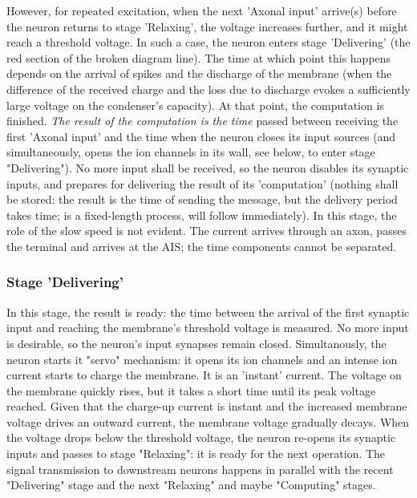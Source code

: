 However, for repeated excitation, when the next 'Axonal input' arrive(s) before
the neuron returns to stage 'Relaxing', the voltage increases further, and it might reach
a threshold voltage. In such a case, the neuron enters stage 'Delivering'
(the red section of the broken diagram line). The time at which point this happens
depends on the arrival of spikes and the discharge of the membrane (when the
difference of the received charge and the loss due to discharge evokes
a sufficiently large voltage on the condenser's capacity). At that point,
the computation is finished. \textit{The result of the computation is
the time} passed between receiving the first 'Axonal input' and the time when
the neuron closes its input sources (and simultaneously, opens the ion channels
in its wall, see below, to enter stage "Delivering").  No more input shall be received, so
the neuron disables its synaptic inputs, and prepares for delivering 
the result of its 'computation' (nothing shall be stored: the result is the time of sending the message, but the delivery period takes time; is a fixed-length
process, will follow immediately). 
In this stage, the role of the slow speed is not evident. The current 
arrives through an axon, passes the terminal and arrives at the AIS;
the time components cannot be separated. 


\subsubsection[Delivering]{Stage 'Delivering'\label{sec:Single-OperationDelivering}}
In this stage,
the result is ready: the time between the arrival of the first
synaptic input and reaching the membrane's threshold voltage is measured.
No more input is desirable, so the neuron's input synapses remain closed.
Simultanously, the neuron starts it "servo" mechanism: it opens its ion channels
and an intense ion current starts to charge the membrane. 
It is an 'instant' current.
The voltage on the membrane quickly rises, but it takes a short time
until its peak voltage reached.
Given that the charge-up current is instant and the increased
membrane voltage drives an outward current, the membrane voltage
gradually decays.
When the voltage drops below the threshold voltage, the neuron re-opens its synaptic inputs and passes to stage "Relaxing": it is ready for the next operation. The signal transmission to downstream neurons
happens in parallel with the recent "Delivering" stage and
the next "Relaxing" and maybe "Computing" stages. 

